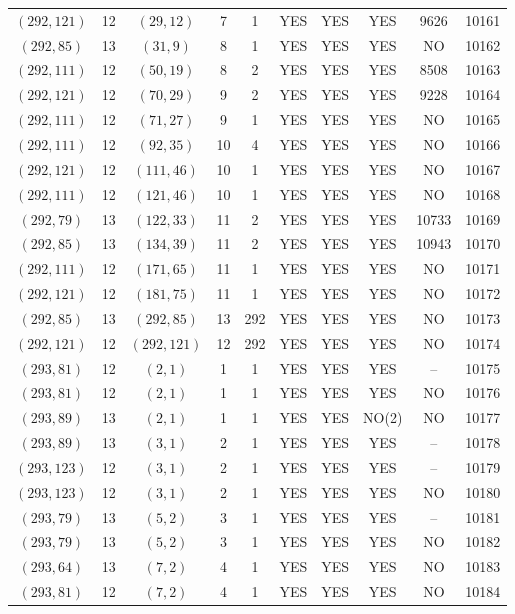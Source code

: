 \begin{longtable}{|c|c|c|c|c|c|c|c|c|c|}
$(292, 121)$ & 12 & $(29, 12)$ & 7 & 1 & YES & YES & YES & 9626 & 10161\\
$(292, 85)$ & 13 & $(31, 9)$ & 8 & 1 & YES & YES & YES & NO & 10162\\
$(292, 111)$ & 12 & $(50, 19)$ & 8 & 2 & YES & YES & YES & 8508 & 10163\\
$(292, 121)$ & 12 & $(70, 29)$ & 9 & 2 & YES & YES & YES & 9228 & 10164\\
$(292, 111)$ & 12 & $(71, 27)$ & 9 & 1 & YES & YES & YES & NO & 10165\\
$(292, 111)$ & 12 & $(92, 35)$ & 10 & 4 & YES & YES & YES & NO & 10166\\
$(292, 121)$ & 12 & $(111, 46)$ & 10 & 1 & YES & YES & YES & NO & 10167\\
$(292, 111)$ & 12 & $(121, 46)$ & 10 & 1 & YES & YES & YES & NO & 10168\\
$(292, 79)$ & 13 & $(122, 33)$ & 11 & 2 & YES & YES & YES & 10733 & 10169\\
$(292, 85)$ & 13 & $(134, 39)$ & 11 & 2 & YES & YES & YES & 10943 & 10170\\
$(292, 111)$ & 12 & $(171, 65)$ & 11 & 1 & YES & YES & YES & NO & 10171\\
$(292, 121)$ & 12 & $(181, 75)$ & 11 & 1 & YES & YES & YES & NO & 10172\\
$(292, 85)$ & 13 & $(292, 85)$ & 13 & 292 & YES & YES & YES & NO & 10173\\
$(292, 121)$ & 12 & $(292, 121)$ & 12 & 292 & YES & YES & YES & NO & 10174\\
$(293, 81)$ & 12 & $(2, 1)$ & 1 & 1 & YES & YES & YES & -- & 10175\\
$(293, 81)$ & 12 & $(2, 1)$ & 1 & 1 & YES & YES & YES & NO & 10176\\
$(293, 89)$ & 13 & $(2, 1)$ & 1 & 1 & YES & YES & NO(2) & NO & 10177\\
$(293, 89)$ & 13 & $(3, 1)$ & 2 & 1 & YES & YES & YES & -- & 10178\\
$(293, 123)$ & 12 & $(3, 1)$ & 2 & 1 & YES & YES & YES & -- & 10179\\
$(293, 123)$ & 12 & $(3, 1)$ & 2 & 1 & YES & YES & YES & NO & 10180\\
$(293, 79)$ & 13 & $(5, 2)$ & 3 & 1 & YES & YES & YES & -- & 10181\\
$(293, 79)$ & 13 & $(5, 2)$ & 3 & 1 & YES & YES & YES & NO & 10182\\
$(293, 64)$ & 13 & $(7, 2)$ & 4 & 1 & YES & YES & YES & NO & 10183\\
$(293, 81)$ & 12 & $(7, 2)$ & 4 & 1 & YES & YES & YES & NO & 10184\\

\end{longtable}

